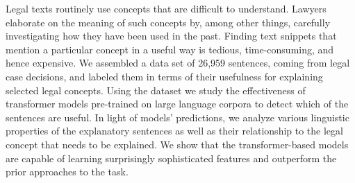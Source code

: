 Legal texts routinely use concepts that are difficult to understand. Lawyers elaborate on the meaning of such concepts by, among other things, carefully investigating how they have been used in the past. Finding text snippets that mention a particular concept in a useful way is tedious, time-consuming, and hence expensive. We assembled a data set of 26,959 sentences, coming from legal case decisions, and labeled them in terms of their usefulness for explaining selected legal concepts. Using the dataset we study the effectiveness of transformer models pre-trained on large language corpora to detect which of the sentences are useful. In light of models' predictions, we analyze various linguistic properties of the explanatory sentences as well as their relationship to the legal concept that needs to be explained. We show that the transformer-based models are capable of learning surprisingly sophisticated features and outperform the prior approaches to the task.
